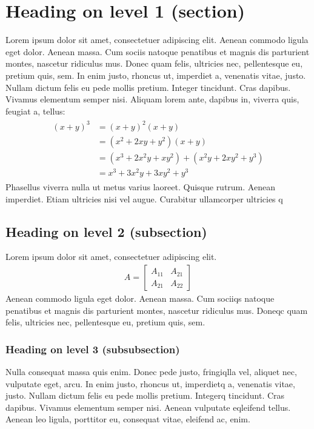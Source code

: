 \section{Heading on level 1 (section)}
Lorem ipsum dolor sit amet, consectetuer adipiscing elit. Aenean commodo ligula
eget dolor. Aenean massa. Cum sociis natoque penatibus et magnis dis parturient
montes, nascetur ridiculus mus. Donec quam felis, ultricies nec, pellentesque
eu, pretium quis, sem. In enim justo, rhoncus ut, imperdiet a, venenatis vitae,
justo. Nullam dictum felis eu pede mollis pretium. Integer tincidunt. Cras
dapibus. Vivamus elementum semper nisi. Aliquam lorem ante, dapibus in, viverra
quis, feugiat a, tellus:
\begin{align} 
	\begin{split}
	(x+y)^3 	&= (x+y)^2(x+y)\\
					&=(x^2+2xy+y^2)(x+y)\\
					&=(x^3+2x^2y+xy^2) + (x^2y+2xy^2+y^3)\\
					&=x^3+3x^2y+3xy^2+y^3
	\end{split}					
\end{align}
Phasellus viverra nulla ut metus varius laoreet. Quisque rutrum. Aenean
imperdiet. Etiam ultricies nisi vel augue. Curabitur ullamcorper ultricies q

\subsection{Heading on level 2 (subsection)}
Lorem ipsum dolor sit amet, consectetuer adipiscing elit. 
\begin{align}
	A = 
	\begin{bmatrix}
	A_{11} & A_{21} \\
  	A_{21} & A_{22}
	\end{bmatrix}
\end{align}
Aenean commodo ligula eget dolor. Aenean massa. Cum sociiqs natoque penatibus et
magnis dis parturient montes, nascetur ridiculus mus. Doneqc quam felis,
ultricies nec, pellentesque eu, pretium quis, sem.

\subsubsection{Heading on level 3 (subsubsection)}
Nulla consequat massa quis enim. Donec pede justo, fringiqlla vel, aliquet nec,
vulputate eget, arcu. In enim justo, rhoncus ut, imperdietq a, venenatis vitae,
justo. Nullam dictum felis eu pede mollis pretium. Integerq tincidunt. Cras
dapibus. Vivamus elementum semper nisi. Aenean vulputate eqleifend tellus.
Aenean leo ligula, porttitor eu, consequat vitae, eleifend ac, enim.

